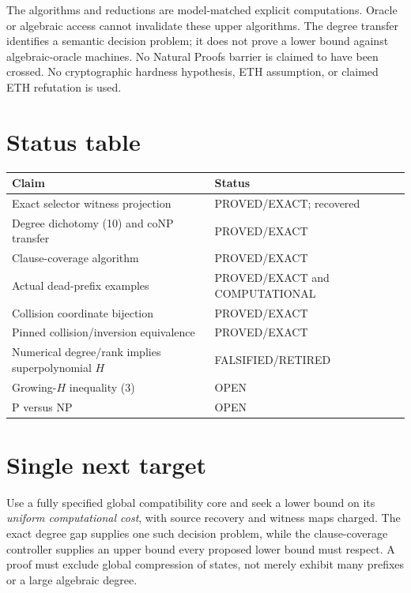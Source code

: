 \documentclass[11pt]{article}
\begin{document}
The algorithms and reductions are model-matched explicit computations.
Oracle or algebraic access cannot invalidate these upper algorithms.
The degree transfer identifies a semantic decision problem; it does
not prove a lower bound against algebraic-oracle machines.
No Natural Proofs barrier is claimed to have been crossed.
No cryptographic hardness hypothesis, ETH assumption, or claimed
ETH refutation is used.

\section*{Status table}
\begin{longtable}{p{}p{}}
\toprule
Claim & Status\\
\midrule
Exact selector witness projection & PROVED/EXACT; recovered\\
Degree dichotomy (10) and coNP transfer & PROVED/EXACT\\
Clause-coverage algorithm & PROVED/EXACT\\
Actual dead-prefix examples & PROVED/EXACT and COMPUTATIONAL\\
Collision coordinate bijection & PROVED/EXACT\\
Pinned collision/inversion equivalence & PROVED/EXACT\\
Numerical degree/rank implies superpolynomial $H$ & FALSIFIED/RETIRED\\
Growing-$H$ inequality (3) & OPEN\\
P versus NP & OPEN\\
\bottomrule
\end{longtable}

\section*{Single next target}
Use a fully specified global compatibility core and seek a lower bound
on its \emph{uniform computational cost}, with source recovery and
witness maps charged. The exact degree gap supplies one such
decision problem, while the clause-coverage controller supplies an
upper bound every proposed lower bound must respect.
A proof must exclude global compression of states, not merely exhibit
many prefixes or a large algebraic degree.



\end{document}
